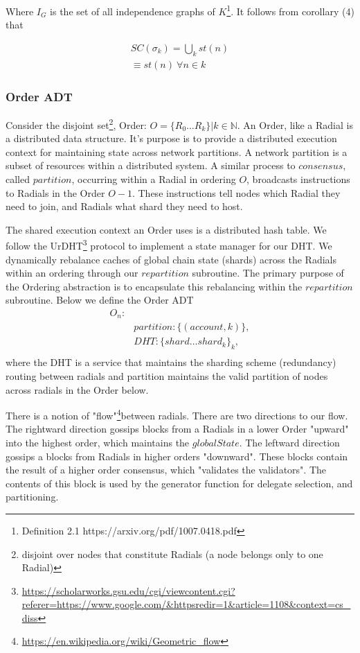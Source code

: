 \documentclass{article}
\begin{document}
Where $I_G$ is the set of all independence graphs of $K$\footnote{Definition 2.1 https://arxiv.org/pdf/1007.0418.pdf}. It follows from corollary (4) that

\begin{equation} \label{eq1}
\begin{split}
SC(\sigma_k) = \bigcup_k st(n) \\
\equiv st(n) \ \forall n \in k
\end{split}
\end{equation}

\subsubsection{Order ADT}
Consider the disjoint set\footnote{disjoint over nodes that constitute Radials (a node belongs only to one Radial)}, Order: $O = \{R_0 \dots R_k \} | k \in \mathbb{N}$. An Order, like a Radial is a distributed data structure. It's purpose is to provide a distributed execution context for maintaining state across network partitions. A network partition is a subset of resources within a distributed system. A similar process to $consensus$, called $partition$, occurring within a Radial in ordering $O$, broadcasts instructions to Radials in the Order $O-1$. These instructions tell nodes which Radial they need to join, and Radials what shard they need to host.  

The shared execution context an Order uses is a distributed hash table. We follow the UrDHT\footnote{\url{https://scholarworks.gsu.edu/cgi/viewcontent.cgi?referer=https://www.google.com/&httpsredir=1&article=1108&context=cs_diss}} protocol to implement a state manager for our DHT. We dynamically rebalance caches of global chain state (shards) across the Radials within an ordering through our $repartition$ subroutine. The primary purpose of the Ordering abstraction is to encapsulate this rebalancing within the $repartition$ subroutine. Below we define the Order ADT
\begin{align*}
O_n: \\ &
partition:   \{(account, k)\}, \\ &
DHT: \{shard \dots shard_k\}_k, \\ &
\end{align*}
where the DHT is a service that maintains the sharding scheme (redundancy) routing between radials and partition maintains the valid partition of nodes across radials in the Order below.

There is a notion of "flow"\footnote{\url{https://en.wikipedia.org/wiki/Geometric_flow}}between radials. There are two directions to our flow. The rightward direction gossips blocks from a Radials in a lower Order "upward" into the highest order, which maintains the $globalState$. The leftward direction gossips a blocks from Radials in higher orders "downward". These blocks contain the result of a higher order consensus, which "validates the validators". The contents of this block is used by the generator function for delegate selection, and partitioning. 
\end{document}
